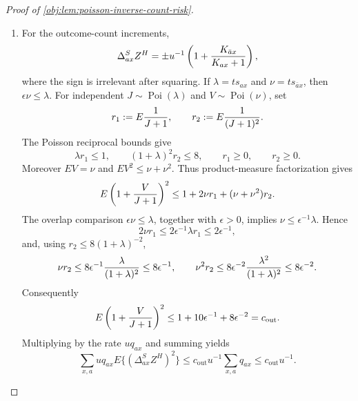 \begin{proof}[Proof of \cref{obj:lem:poisson-inverse-count-risk}]
\begin{enumerate}
\item
For the outcome-count increments,
\[
\Delta^S_{ax}Z^H
=
\pm u^{-1}\left(1+{K_{\bar a x}\over K_{ax}+1}\right),
\]
where the sign is irrelevant after squaring.  If
\(\lambda=ts_{ax}\) and \(\nu=ts_{\bar a x}\), then \(\epsilon\nu\le\lambda\).  For independent
\(J\sim\operatorname{Poi}(\lambda)\) and \(V\sim\operatorname{Poi}(\nu)\), set
\[
r_1:=E{1\over J+1},
\qquad
r_2:=E{1\over (J+1)^2}.
\]
The Poisson reciprocal bounds give
\[
\lambda r_1\le1,
\qquad
(1+\lambda)^2r_2\le8,
\qquad
r_1\ge0,
\qquad
r_2\ge0.
\]
Moreover \(E V=\nu\) and \(E V^2\le \nu+\nu^2\).  Thus product-measure factorization gives
\[
E\left(1+{V\over J+1}\right)^2
\le
1+2\nu r_1+(\nu+\nu^2)r_2.
\]
The overlap comparison \(\epsilon\nu\le\lambda\), together with \(\epsilon>0\), implies \(\nu\le\epsilon^{-1}\lambda\).  Hence
\[
2\nu r_1\le 2\epsilon^{-1}\lambda r_1\le2\epsilon^{-1},
\]
and, using \(r_2\le 8(1+\lambda)^{-2}\),
\[
\nu r_2
\le
8\epsilon^{-1}{\lambda\over(1+\lambda)^2}
\le 8\epsilon^{-1},
\qquad
\nu^2r_2
\le
8\epsilon^{-2}{\lambda^2\over(1+\lambda)^2}
\le8\epsilon^{-2}.
\]
Consequently
\[
E\left(1+{V\over J+1}\right)^2
\le
1+10\epsilon^{-1}+8\epsilon^{-2}
=
c_{\mathrm{out}}.
\]
Multiplying by the rate \(uq_{ax}\) and summing yields
\[
\sum_{x,a}u q_{ax}E\{(\Delta^S_{ax}Z^H)^2\}
\le
c_{\mathrm{out}}u^{-1}\sum_{x,a}q_{ax}
\le
c_{\mathrm{out}}u^{-1}.
\]


\end{enumerate}
\end{proof}
